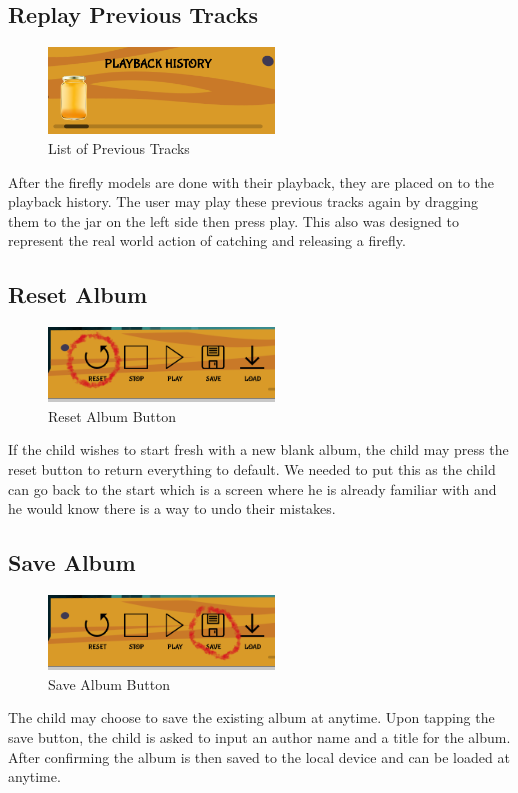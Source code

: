 \subsection{Replay Previous Tracks}

\begin{figure}[H]
    \centering
    \includegraphics[width=6cm]{figures/historyplayback.png}
    \caption{List of Previous Tracks}
    \label{fig:firefly2}
\end{figure}

After the firefly models are done with their playback, they are placed on to the playback history. The user may play these previous tracks again by dragging them to the jar on the left side then press play. This also was designed to represent the real world action of catching and releasing a firefly.

\subsection{Reset Album}

\begin{figure}[H]
    \centering
    \includegraphics[width=6cm]{figures/resetwork.png}
    \caption{Reset Album Button}
    \label{fig:firefly2}
\end{figure}

If the child wishes to start fresh with a new blank album, the child may press the reset button to return everything to default. We needed to put this as the child can go back to the start which is a screen where he is already familiar with and he would know there is a way to undo their mistakes.

\subsection{Save Album}

\begin{figure}[H]
    \centering
    \includegraphics[width=6cm]{figures/Save.png}
    \caption{Save Album Button}
    \label{fig:firefly2}
\end{figure}
The child may choose to save the existing album at anytime. Upon tapping the save button, the child is asked to input an author name and a title for the album. After confirming the album is then saved to the local device and can be loaded at anytime.
